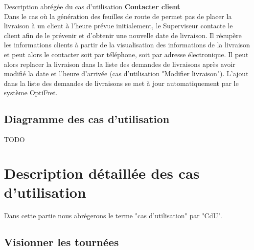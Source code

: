 \documentclass[a4paper]{article}
\begin{document}
Description abrégée du cas d'utilisation
\textbf{Contacter client} \\

Dans le cas où la génération des feuilles de route de permet pas de placer la
livraison à un client à l'heure prévue initialement, le Superviseur contacte le
client afin de le prévenir et d'obtenir une nouvelle date de livraison. Il
récupère les informations clients à partir de la visualisation des informations
de la livraison et peut alors le contacter soit par téléphone, soit par adresse
électronique. Il peut alors replacer la livraison dans la liste des demandes de
livraisons après avoir modifié la date et l'heure d'arrivée (cas d'utilisation
"Modifier livraison"). L'ajout dans la liste des demandes de livraisons se met
à jour automatiquement par le système OptiFret. \\

\subsection{Diagramme des cas d'utilisation}
{\huge TODO}

\section{Description détaillée des cas d'utilisation}

Dans cette partie nous abrégerons le terme "cas d'utilisation" par "CdU".

\subsection{Visionner les tournées}
\end{document}
